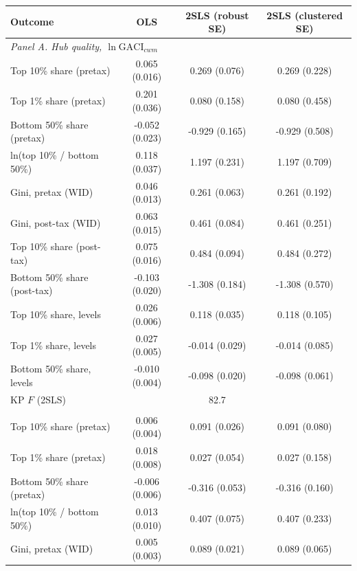\begin{tabular}{lccc}
\toprule
Outcome & OLS & 2SLS (robust SE) & 2SLS (clustered SE) \\
\midrule
\multicolumn{4}{l}{\emph{Panel A. Hub quality, $\ln\mathrm{GACI}_{cwm}$}}\\
Top 10\% share (pretax) & 0.065\sym{***} (0.016) & 0.269\sym{***} (0.076) & 0.269 (0.228) \\
Top 1\% share (pretax) & 0.201\sym{***} (0.036) & 0.080 (0.158) & 0.080 (0.458) \\
Bottom 50\% share (pretax) & -0.052\sym{**} (0.023) & -0.929\sym{***} (0.165) & -0.929\sym{*} (0.508) \\
ln(top 10\% / bottom 50\%) & 0.118\sym{***} (0.037) & 1.197\sym{***} (0.231) & 1.197\sym{*} (0.709) \\
Gini, pretax (WID) & 0.046\sym{***} (0.013) & 0.261\sym{***} (0.063) & 0.261 (0.192) \\
Gini, post-tax (WID) & 0.063\sym{***} (0.015) & 0.461\sym{***} (0.084) & 0.461\sym{*} (0.251) \\
Top 10\% share (post-tax) & 0.075\sym{***} (0.016) & 0.484\sym{***} (0.094) & 0.484\sym{*} (0.272) \\
Bottom 50\% share (post-tax) & -0.103\sym{***} (0.020) & -1.308\sym{***} (0.184) & -1.308\sym{**} (0.570) \\
Top 10\% share, levels & 0.026\sym{***} (0.006) & 0.118\sym{***} (0.035) & 0.118 (0.105) \\
Top 1\% share, levels & 0.027\sym{***} (0.005) & -0.014 (0.029) & -0.014 (0.085) \\
Bottom 50\% share, levels & -0.010\sym{***} (0.004) & -0.098\sym{***} (0.020) & -0.098 (0.061) \\
KP $F$ (2SLS) & & 82.7 & \\
\addlinespace
\multicolumn{4}{l}{\emph{Panel B. Total connectivity, $\ln\mathrm{GACI}_{sum}$}}\\
Top 10\% share (pretax) & 0.006 (0.004) & 0.091\sym{***} (0.026) & 0.091 (0.080) \\
Top 1\% share (pretax) & 0.018\sym{**} (0.008) & 0.027 (0.054) & 0.027 (0.158) \\
Bottom 50\% share (pretax) & -0.006 (0.006) & -0.316\sym{***} (0.053) & -0.316\sym{**} (0.160) \\
ln(top 10\% / bottom 50\%) & 0.013 (0.010) & 0.407\sym{***} (0.075) & 0.407\sym{*} (0.233) \\
Gini, pretax (WID) & 0.005 (0.003) & 0.089\sym{***} (0.021) & 0.089 (0.065) \\

\end{tabular}
